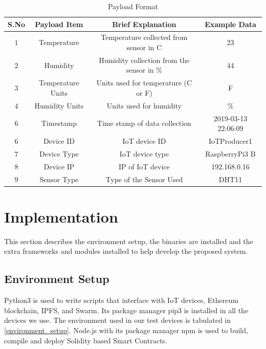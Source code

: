 \documentclass[11pt,openright]{report}
\begin{document}
\begin{table}[!htbp]
    \renewcommand{\arraystretch}{1.3}
    \caption{Payload Format}
    \label{payload_format}
    \centering
    \begin{tabular}{|c|c|c|c|}
        \hline
        \bfseries S.No & \bfseries Payload Item & \bfseries Brief Explanation & \bfseries Example Data \\
        \hline\hline
        $1$ & Temperature & Temperature collected from sensor in C & 23 \\ \hline
        $2$ & Humidity & Humidity collection from the sensor in \% & 44 \\ \hline
        $3$ & Temperature Units & Units used for temperature (C or F) & F \\ \hline
        $4$ & Humidity Units & Units used for humidity & \% \\ \hline
        $6$ & Timestamp & Time stamp of data collection & 2019-03-13 22:06:09 \\ \hline
        $6$ & Device ID & IoT device ID & IoTProducer1 \\ \hline
        $7$ & Device Type & IoT device type & RaspberryPi3 B \\ \hline
        $8$ & Device IP & IP of IoT device& 192.168.0.16 \\ \hline
        $9$ & Sensor Type & Type of the Sensor Used & DHT11 \\ \hline
    \end{tabular}
\end{table}


\section{Implementation}
This section describes the environment setup, the binaries are installed and the extra frameworks and modules installed to help develop the proposed system.
\subsection{Environment Setup}
Python3 is used to write scripts that interface with IoT devices, Ethereum blockchain, IPFS, and Swarm. Its package manager pip3 is installed in all the devices we use. The environment used in our test devices is tabulated in \ref{environment_setup}. Node.js with its package manager npm is used to build, compile and deploy Solidity based Smart Contracts. 
\end{document}
